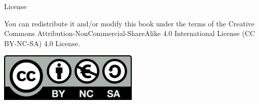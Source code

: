 \documentclass[envcountsect,usenames,dvipsnames]{beamer}
\theoremstyle{mystyle}
\begin{document}
\begin{frame}{License}
	
	You can redistribute it and/or modify this book under the terms of the Creative Commons Attribution-NonCommercial-ShareAlike 4.0 International License (CC BY-NC-SA) 4.0 License.
	
	\vspace{0.5cm}
	\begin{center}
		\includegraphics[width=0.5\textwidth]{Images/licence.png}
	\end{center}
	
\end{frame}
\end{document}
